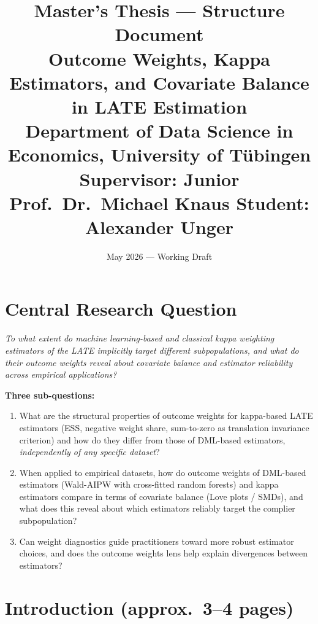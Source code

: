 \documentclass[12pt, a4paper]{article}
\title{\textbf{Master's Thesis --- Structure Document}\\[0.4em]
\large Outcome Weights, Kappa Estimators, and Covariate Balance\\
in LATE Estimation\\[0.3em]
\normalsize Department of Data Science in Economics, University of Tübingen\\
Supervisor: Junior Prof.\ Dr.\ Michael Knaus \quad Student: Alexander Unger}
\date{May 2026 --- Working Draft}
\begin{document}
\maketitle
\tableofcontents
\newpage

\section*{Central Research Question}

\begin{mdframed}[backgroundcolor=boxbg,linecolor=chapterblue,linewidth=1.5pt]
\textit{To what extent do machine learning-based and classical kappa weighting estimators
of the LATE implicitly target different subpopulations, and what do their outcome
weights reveal about covariate balance and estimator reliability across empirical
applications?}
\end{mdframed}

\medskip
\noindent\textbf{Three sub-questions:}
\begin{enumerate}[leftmargin=1.5cm]
  \item[\textbf{RQ1.}] What are the structural properties of outcome weights for kappa-based LATE estimators (ESS, negative weight share, sum-to-zero as translation invariance criterion) and how do they differ from those of DML-based estimators, \emph{independently of any specific dataset}?
  \item[\textbf{RQ2.}] When applied to empirical datasets, how do outcome weights of DML-based estimators (Wald-AIPW with cross-fitted random forests) and kappa estimators compare in terms of covariate balance (Love plots / SMDs), and what does this reveal about which estimators reliably target the complier subpopulation?
  \item[\textbf{RQ3.}] Can weight diagnostics guide practitioners toward more robust estimator choices, and does the outcome weights lens help explain divergences between estimators?
\end{enumerate}

\bigskip

\section{Introduction \textnormal{\small(approx.\ 3--4 pages)}}
\end{document}
